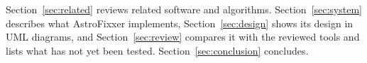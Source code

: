 Section~\ref{sec:related} reviews related software and algorithms. Section~\ref{sec:system} describes what AstroFixxer implements, Section~\ref{sec:design} shows its design in UML diagrams, and Section~\ref{sec:review} compares it with the reviewed tools and lists what has not yet been tested. Section~\ref{sec:conclusion} concludes.
